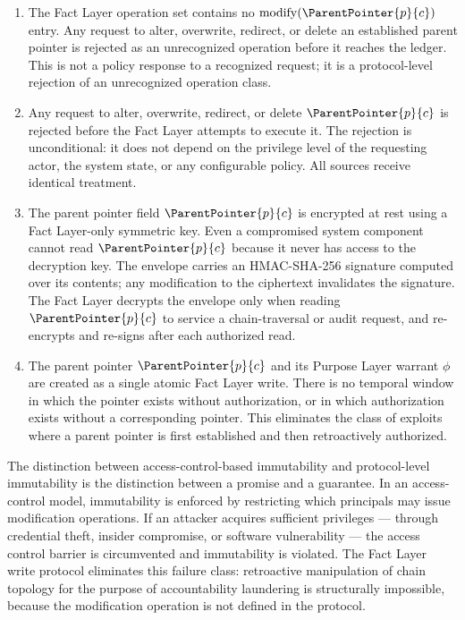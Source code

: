 \begin{enumerate}
    \item[(W1) \textbf{No modification operation defined.}] The Fact Layer operation set contains no $\mathrm{modify}(\ParentPointer{p}{c})$ entry. Any request to alter, overwrite, redirect, or delete an established parent pointer is rejected as an unrecognized operation before it reaches the ledger. This is not a policy response to a recognized request; it is a protocol-level rejection of an unrecognized operation class.
    \item[(W2) \textbf{All modification requests rejected unconditionally.}] Any request to alter, overwrite, redirect, or delete $\ParentPointer{p}{c}$ is rejected before the Fact Layer attempts to execute it. The rejection is unconditional: it does not depend on the privilege level of the requesting actor, the system state, or any configurable policy. All sources receive identical treatment.
    \item[(W3) \textbf{Sealed memory envelope.}] The parent pointer field $\ParentPointer{p}{c}$ is encrypted at rest using a Fact Layer-only symmetric key. Even a compromised system component cannot read $\ParentPointer{p}{c}$ because it never has access to the decryption key. The envelope carries an HMAC-SHA-256 signature computed over its contents; any modification to the ciphertext invalidates the signature. The Fact Layer decrypts the envelope only when reading $\ParentPointer{p}{c}$ to service a chain-traversal or audit request, and re-encrypts and re-signs after each authorized read.
    \item[(W4) \textbf{Atomic provisioning.}] The parent pointer $\ParentPointer{p}{c}$ and its Purpose Layer warrant $\phi$ are created as a single atomic Fact Layer write. There is no temporal window in which the pointer exists without authorization, or in which authorization exists without a corresponding pointer. This eliminates the class of exploits where a parent pointer is first established and then retroactively authorized.
\end{enumerate}

The distinction between access-control-based immutability and protocol-level immutability is the distinction between a promise and a guarantee. In an access-control model, immutability is enforced by restricting which principals may issue modification operations. If an attacker acquires sufficient privileges --- through credential theft, insider compromise, or software vulnerability --- the access control barrier is circumvented and immutability is violated. The Fact Layer write protocol eliminates this failure class: retroactive manipulation of chain topology for the purpose of accountability laundering is structurally impossible, because the modification operation is not defined in the protocol.

